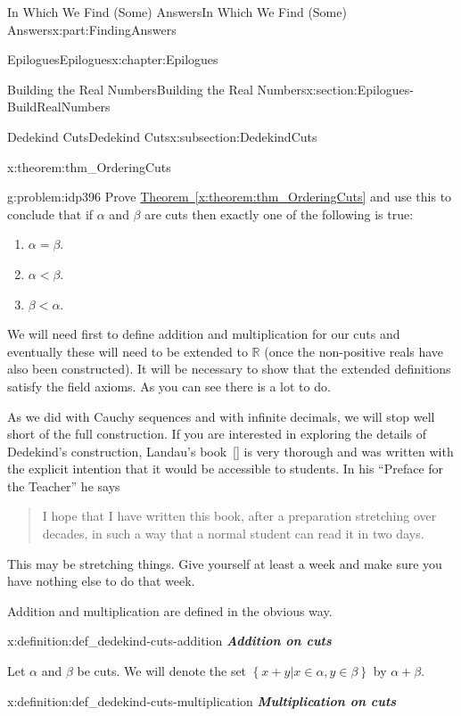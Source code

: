 \documentclass[oneside,10pt,]{book}
\newcommand{\xreffont}{\relax}
\newcommand{\alert}[1]{\textbf{\textit{#1}}}
\numberwithin{equation}{section}
\newcommand{\RR}{\mathbb {R}}
\newcommand{\lt}{<}
\begin{document}
\begin{partptx}{In Which We Find (Some) Answers}{}{In Which We Find (Some) Answers}{}{}{x:part:FindingAnswers}
\begin{chapterptx}{Epilogues}{}{Epilogues}{}{}{x:chapter:Epilogues}
\begin{sectionptx}{Building the Real Numbers}{}{Building the Real Numbers}{}{}{x:section:Epilogues-BuildRealNumbers}
\begin{subsectionptx}{Dedekind Cuts}{}{Dedekind Cuts}{}{}{x:subsection:DedekindCuts}
\begin{theorem}{}{}{x:theorem:thm_OrderingCuts}
\end{theorem}
\begin{problem}{}{g:problem:idp396}%
\index{\(\RR\)!ordering Dedekind cuts} Prove \hyperref[x:theorem:thm_OrderingCuts]{Theorem~{\xreffont\ref{x:theorem:thm_OrderingCuts}}} and use this to conclude that if \(\alpha\) and \(\beta\) are cuts then exactly one of the following is true:%
\begin{enumerate}
\item{}\(\alpha=\beta\).%
\item{}\(\alpha\lt \beta\).%
\item{}\(\beta\lt \alpha\).%
\end{enumerate}
%
\end{problem}
We will need first to define addition and multiplication for our cuts and eventually these will need to be extended to \(\RR\) (once the non-positive reals have also been constructed). It will be necessary to show that the extended definitions satisfy the field axioms. As you can see there is a lot to do.%
\par
As we did with Cauchy sequences and with infinite decimals, we will stop well short of the full construction. If you are interested in  exploring the details of Dedekind's construction, Landau's book~\hyperlink{x:biblio:landau66__found_analy}{[{\xreffont 7}]} is very thorough and was written with the explicit intention that it would be accessible to students. In his ``Preface for the Teacher'' he says%
\begin{quote}%
I hope that I have written this book, after a preparation stretching over decades, in such a way that a normal student can read it in two days.%
\end{quote}
This may be stretching things. Give yourself at least a week and make sure you have nothing else to do that week.%
\par
Addition and multiplication are defined in the obvious way.%
\begin{definition}{}{x:definition:def_dedekind-cuts-addition}%
\alert{Addition on cuts}%
\par
{} Let \(\alpha\) and \(\beta\) be cuts. We will denote the set \(\left\{x+y|x\in\alpha,
y\in\beta\right\}\) by \(\alpha+\beta\).%
\end{definition}
\begin{definition}{}{x:definition:def_dedekind-cuts-multiplication}%
\alert{Multiplication on cuts}%

\end{definition}
\end{subsectionptx}
\end{sectionptx}
\end{chapterptx}
\end{partptx}
\end{document}

